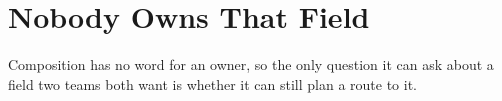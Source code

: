 \chapter{Nobody Owns That Field}
\label{ch:ownership}

Composition has no word for an owner, so the only question it can ask about a
field two teams both want is whether it can still plan a route to it.







